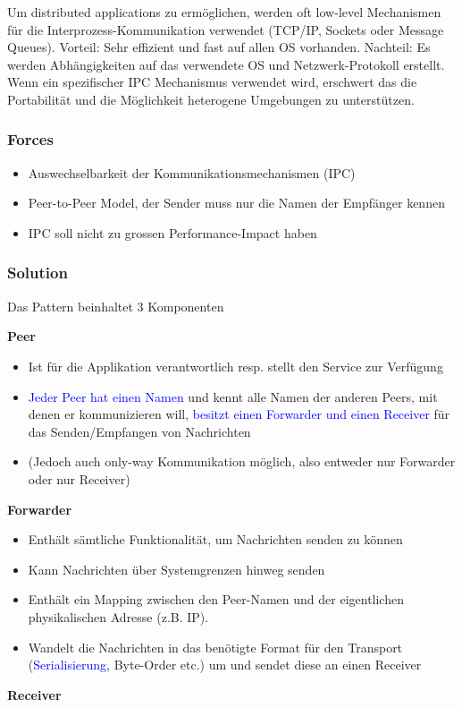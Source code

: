 Um distributed applications zu ermöglichen, werden oft low-level Mechanismen für die Interprozess-Kommunikation verwendet (TCP/IP, Sockets oder Message Queues). Vorteil: Sehr effizient und fast auf allen OS vorhanden. Nachteil: Es werden Abhängigkeiten auf das verwendete OS und Netzwerk-Protokoll erstellt. Wenn ein spezifischer IPC Mechanismus verwendet wird, erschwert das die Portabilität und die Möglichkeit heterogene Umgebungen zu unterstützen.

\subsubsection{Forces}

\begin{itemize}
    \item Auswechselbarkeit der Kommunikationsmechanismen (IPC)
    \item Peer-to-Peer Model, der Sender muss nur die Namen der Empfänger kennen
    \item IPC soll nicht zu grossen Performance-Impact haben
\end{itemize}

\subsubsection{Solution}

Das Pattern beinhaltet 3 Komponenten

\textbf{Peer}

\begin{itemize}
    \item Ist für die Applikation verantwortlich resp. stellt den Service zur Verfügung
    \item \textcolor{blue}{Jeder Peer hat einen Namen} und kennt alle Namen der anderen Peers, mit denen er kommunizieren will, \textcolor{blue}{besitzt einen Forwarder und einen Receiver} für das Senden/Empfangen von Nachrichten
    \item (Jedoch auch only-way Kommunikation möglich, also entweder nur Forwarder oder nur Receiver)
\end{itemize}
\vspace{10pt}
\textbf{Forwarder}

\begin{itemize}
    \item Enthält sämtliche Funktionalität, um Nachrichten senden zu können
    \item Kann Nachrichten über Systemgrenzen hinweg senden
    \item Enthält ein Mapping zwischen den Peer-Namen und der eigentlichen physikalischen Adresse (z.B. IP).
    \item Wandelt die Nachrichten in das benötigte Format für den Transport (\textcolor{blue}{Serialisierung}, Byte-Order etc.) um und sendet diese an einen Receiver
\end{itemize}
\vspace{10pt}
\textbf{Receiver}

